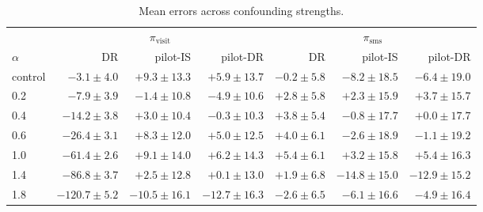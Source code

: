 \begin{table}[!htbp]
\centering
\caption{Mean errors across confounding strengths.}
\label{tab:frontier}
\footnotesize
\begin{adjustbox}{max width=\linewidth}
\begin{tabular}{lrrrrrr}
\toprule
& \multicolumn{3}{c}{$\pi_{\mathrm{visit}}$} & \multicolumn{3}{c}{$\pi_{\mathrm{sms}}$} \\
\cmidrule(lr){2-4}\cmidrule(lr){5-7}
$\alpha$ & DR & pilot-IS & pilot-DR & DR & pilot-IS & pilot-DR \\
\midrule
control & $-3.1 \pm 4.0$ & $+9.3 \pm 13.3$ & $+5.9 \pm 13.7$ & $-0.2 \pm 5.8$ & $-8.2 \pm 18.5$ & $-6.4 \pm 19.0$ \\
0.2 & $-7.9 \pm 3.9$ & $-1.4 \pm 10.8$ & $-4.9 \pm 10.6$ & $+2.8 \pm 5.8$ & $+2.3 \pm 15.9$ & $+3.7 \pm 15.7$ \\
0.4 & $-14.2 \pm 3.8$ & $+3.0 \pm 10.4$ & $-0.3 \pm 10.3$ & $+3.8 \pm 5.4$ & $-0.8 \pm 17.7$ & $+0.0 \pm 17.7$ \\
0.6 & $-26.4 \pm 3.1$ & $+8.3 \pm 12.0$ & $+5.0 \pm 12.5$ & $+4.0 \pm 6.1$ & $-2.6 \pm 18.9$ & $-1.1 \pm 19.2$ \\
1.0 & $-61.4 \pm 2.6$ & $+9.1 \pm 14.0$ & $+6.2 \pm 14.3$ & $+5.4 \pm 6.1$ & $+3.2 \pm 15.8$ & $+5.4 \pm 16.3$ \\
1.4 & $-86.8 \pm 3.7$ & $+2.5 \pm 12.8$ & $+0.1 \pm 13.0$ & $+1.9 \pm 6.8$ & $-14.8 \pm 15.0$ & $-12.9 \pm 15.2$ \\
1.8 & $-120.7 \pm 5.2$ & $-10.5 \pm 16.1$ & $-12.7 \pm 16.3$ & $-2.6 \pm 6.5$ & $-6.1 \pm 16.6$ & $-4.9 \pm 16.4$ \\
\bottomrule
\end{tabular}
\end{adjustbox}
\end{table}
